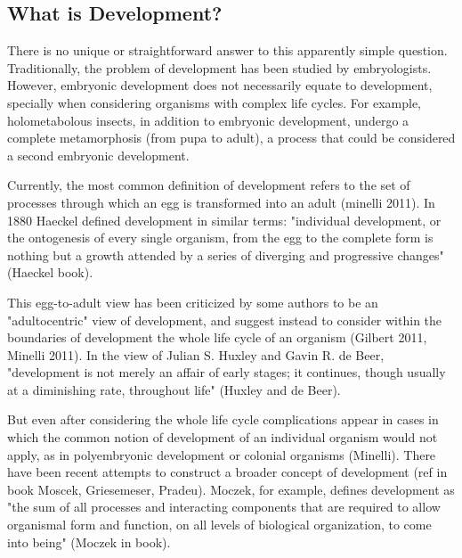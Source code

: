 
\subsection{What is Development?}

There is no unique or straightforward answer to this apparently simple question.
Traditionally, the problem of development has been studied by embryologists. However, embryonic development does not necessarily equate to development,
specially when considering organisms with complex life cycles. For example, holometabolous insects, in addition to embryonic development, undergo a complete metamorphosis (from pupa to adult), a process that could be considered a second embryonic development.

Currently, the most common definition of development refers to the set of processes through which an egg is transformed into an adult (minelli 2011).
In 1880 Haeckel defined development in similar terms: "individual development, or the ontogenesis of every single organism, from the egg to the complete form is nothing but a growth attended by a series of diverging and progressive changes" (Haeckel book).

This egg-to-adult view has been criticized by some authors to be an "adultocentric" view of development, and suggest instead to consider within the boundaries of development the whole life cycle of an organism (Gilbert 2011, Minelli 2011).
In the view of Julian S. Huxley and Gavin R. de Beer, "development is not merely an affair of early stages; it continues, though usually at a diminishing rate, throughout life" (Huxley and de Beer).


But even after considering the whole life cycle complications appear in cases in which the common notion of development of an individual organism would not apply, as in polyembryonic development or colonial organisms (Minelli).
There have been recent attempts to construct a broader concept of development (ref in book Moscek, Griesemeser, Pradeu). Moczek, for example, defines development as "the sum of all processes and interacting components that are required to allow organismal form and function, on all levels of biological organization, to come into being" (Moczek in book).

